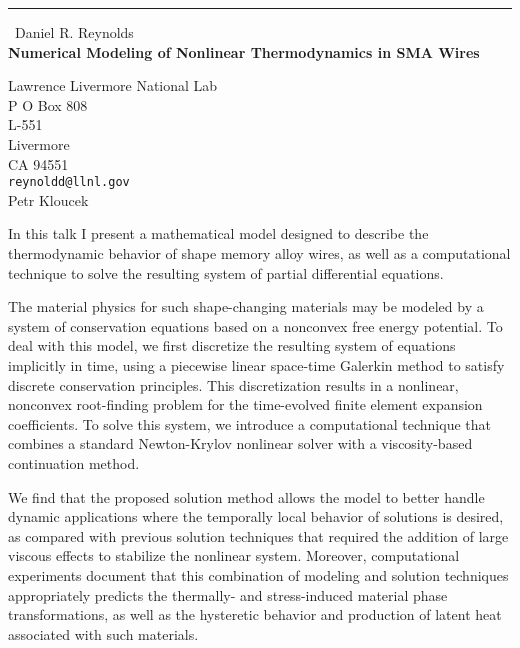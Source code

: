 \documentclass{report}
\begin{document}
\begin{center}
\rule{6in}{1pt} \
{\large Daniel R. Reynolds \\
{\bf Numerical Modeling of Nonlinear Thermodynamics in SMA Wires}}

Lawrence Livermore National Lab \\ P O Box 808 \\ L-551 \\ Livermore \\ CA 94551
\\
{\tt reynoldd@llnl.gov}\\
Petr Kloucek\end{center}

In this talk I present a mathematical model designed to describe the
thermodynamic behavior of shape memory alloy wires, as well as a
computational technique to solve the resulting system of partial
differential equations.

The material physics for such shape-changing materials may be modeled by
a system of conservation equations based on a nonconvex free energy
potential. To deal with this model, we first discretize the resulting
system of equations implicitly in time, using a piecewise linear
space-time Galerkin method to satisfy discrete conservation principles.
This discretization results in a nonlinear, nonconvex root-finding
problem for the time-evolved finite element expansion coefficients. To
solve this system, we introduce a computational technique that combines a
standard Newton-Krylov nonlinear solver with a viscosity-based
continuation method.

We find that the proposed solution method allows the model to better
handle dynamic applications where the temporally local behavior of
solutions is desired, as compared with previous solution techniques that
required the addition of large viscous effects to stabilize the nonlinear
system. Moreover, computational experiments document that this
combination of modeling and solution techniques appropriately predicts
the thermally- and stress-induced material phase transformations, as well
as the hysteretic behavior and production of latent heat associated with
such materials.
\end{document}
